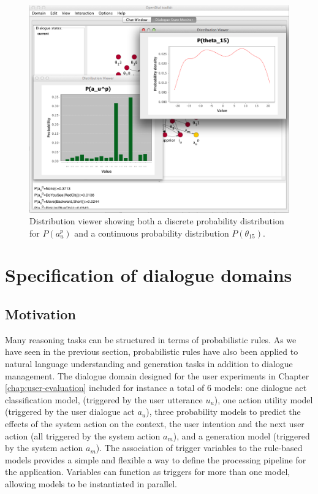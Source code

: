 \begin{figure}[h] 
\begin{center}
\includegraphics[scale=0.40]{imgs/gui-distribviewer.png}
\end{center} 
\caption{Distribution viewer showing both a discrete probability distribution for $P(a_u^p)$ and a continuous probability distribution $P(\theta_{15})$.}
\label{fig:gui-distribviewer}
\end{figure}

\section{Specification of dialogue domains}
\label{sec:domain-specification}

\subsection{Motivation}

Many reasoning tasks can be structured in terms of probabilistic rules.  As we have seen in the previous section, probabilistic rules have also been applied to natural language understanding and generation tasks in addition to dialogue management. The dialogue domain designed for the user experiments in Chapter \ref{chap:user-evaluation} included for instance a total of 6 models: one dialogue act classification model, (triggered by the user utterance $u_u$), one action utility model (triggered by the user dialogue act $a_u$), three probability models to predict the effects of the system action on the context, the user intention and the next user action (all triggered by the system action $a_m$), and a generation model (triggered by the system action $a_m$).  The association of trigger variables to the rule-based models provides a simple and flexible a way to define the processing pipeline for the application.  Variables can function as triggers for more than one model, allowing models to be instantiated in parallel.

